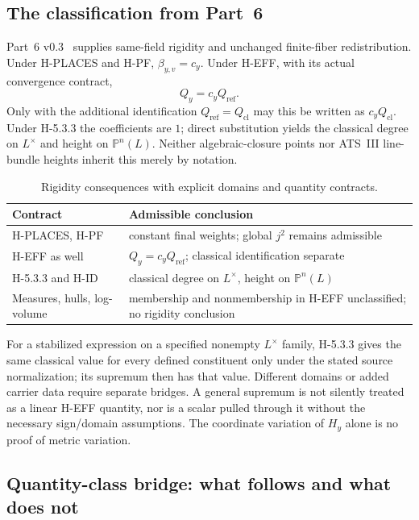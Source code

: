 \documentclass[11pt,a4paper]{article}
\theoremstyle{definition}
\theoremstyle{remark}
\begin{document}
\subsection{The classification from Part~6}

Part~6 v0.3~\cite{part6} supplies same-field rigidity and unchanged
finite-fiber redistribution. Under H-PLACES and H-PF, $\beta_{y,v}=c_y$.
Under H-EFF, with its actual convergence contract,
\[
 Q_y=c_y Q_{\mathrm{ref}}.
\]
Only with the additional identification $Q_{\mathrm{ref}}=Q_{\mathrm{cl}}$
may this be written as $c_yQ_{\mathrm{cl}}$. Under H-5.3.3 the coefficients
are $1$; direct substitution yields the classical degree on $L^\times$
and height on $\mathbb P^n(L)$. Neither algebraic-closure points nor
ATS~III line-bundle heights inherit this merely by notation.

\begin{table}[htbp]\centering\small
\caption{Rigidity consequences with explicit domains and quantity contracts.}
\label{tab:rigidity-consequences}
\begin{tabularx}{\textwidth}{@{}>{\raggedright\arraybackslash}p{} >{\raggedright\arraybackslash}X@{}}
\toprule Contract & Admissible conclusion \\\midrule
H-PLACES, H-PF & constant final weights; global $j^2$ remains admissible \\
H-EFF as well & $Q_y=c_yQ_{\mathrm{ref}}$; classical identification separate \\
H-5.3.3 and H-ID & classical degree on $L^\times$, height on $\mathbb P^n(L)$ \\
Measures, hulls, log-volume & membership and nonmembership in H-EFF unclassified; no rigidity conclusion \\
\bottomrule\end{tabularx}\end{table}

For a stabilized expression on a specified nonempty $L^\times$ family,
H-5.3.3 gives the same classical value for every defined constituent only
under the stated source normalization; its supremum then has that value.
Different domains or added carrier data require separate bridges. A general
supremum is not silently treated as a linear H-EFF quantity, nor is a
scalar pulled through it without the necessary sign/domain assumptions.
The coordinate variation of $H_y$ alone is no proof of metric variation.

\subsection{Quantity-class bridge: what follows and what does not}\label{sec:bridge}
\end{document}
